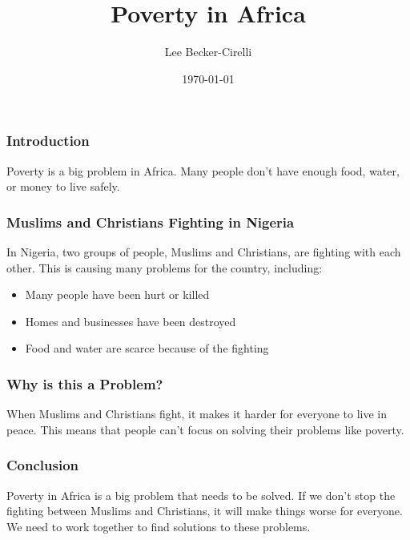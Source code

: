 \documentclass{beamer}
\title{Poverty in Africa}
\author{Lee Becker-Cirelli}
\institute{Rutgers University}
\date{\today}
\begin{document}
\begin{frame}
  \titlepage
\end{frame}

\begin{frame}
  \frametitle{Introduction}
  Poverty is a big problem in Africa. Many people don't have enough food, water, or money to live safely.
\end{frame}

\begin{frame}
  \frametitle{Muslims and Christians Fighting in Nigeria}
  In Nigeria, two groups of people, Muslims and Christians, are fighting with each other. This is causing many problems for the country, including:
  \begin{itemize}
    \item Many people have been hurt or killed
    \item Homes and businesses have been destroyed
    \item Food and water are scarce because of the fighting
  \end{itemize}
\end{frame}

\begin{frame}
  \frametitle{Why is this a Problem?}
  When Muslims and Christians fight, it makes it harder for everyone to live in peace. This means that people can't focus on solving their problems like poverty.
\end{frame}

\begin{frame}
  \frametitle{Conclusion}
  Poverty in Africa is a big problem that needs to be solved. If we don't stop the fighting between Muslims and Christians, it will make things worse for everyone. We need to work together to find solutions to these problems.
\end{frame}
\end{document}
